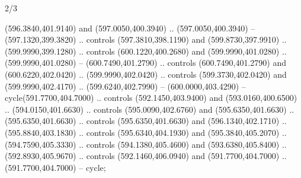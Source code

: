 \begin{flagdescription}{2/3}
\begin{scope}[xshift=0.5\flaglength,yshift=0.5\flagwidth,scale=\flagwidth/638.38]
\begin{scope}[y=0.80pt, x=0.80pt, yscale=-1,shift={(-600,-400)}]
\begin{scope}[shift={(-0.02,2.173)}]
  (596.3840,401.9140) and (597.0050,400.3940) .. (597.0050,400.3940) --
  (597.1320,399.3820) .. controls (597.3810,398.1190) and (599.8730,397.9910) ..
  (599.9990,399.1280) .. controls (600.1220,400.2680) and (599.9990,401.0280) ..
  (599.9990,401.0280) -- (600.7490,401.2790) .. controls (600.7490,401.2790) and
  (600.6220,402.0420) .. (599.9990,402.0420) .. controls (599.3730,402.0420) and
  (599.9990,402.4170) .. (599.6240,402.7990) -- (600.0000,403.4290) --
  cycle(591.7700,404.7000) .. controls (592.1450,403.9400) and
  (593.0160,400.6500) .. (594.0150,401.6630) .. controls (595.0090,402.6760) and
  (595.6350,401.6630) .. (595.6350,401.6630) .. controls (595.6350,401.6630) and
  (596.1340,402.1710) .. (595.8840,403.1830) .. controls (595.6340,404.1930) and
  (595.3840,405.2070) .. (594.7590,405.3330) .. controls (594.1380,405.4600) and
  (593.6380,405.8400) .. (592.8930,405.9670) .. controls (592.1460,406.0940) and
  (591.7700,404.7000) .. (591.7700,404.7000) -- cycle;
\end{scope}
\end{scope}
\end{scope}
\framecode{}
\end{flagdescription}
